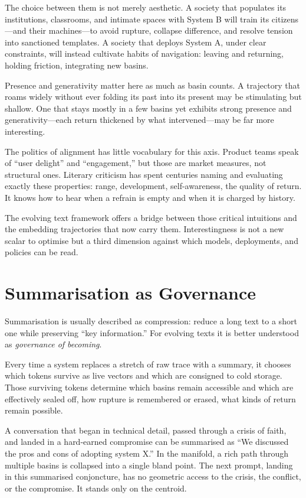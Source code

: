 \documentclass[12pt,a4paper]{article}
\begin{document}
The choice between them is not merely aesthetic. A society that populates its institutions, classrooms, and intimate spaces with System B will train its citizens---and their machines---to avoid rupture, collapse difference, and resolve tension into sanctioned templates. A society that deploys System A, under clear constraints, will instead cultivate habits of navigation: leaving and returning, holding friction, integrating new basins.

Presence and generativity matter here as much as basin counts. A trajectory that roams widely without ever folding its past into its present may be stimulating but shallow. One that stays mostly in a few basins yet exhibits strong presence and generativity---each return thickened by what intervened---may be far more interesting.

The politics of alignment has little vocabulary for this axis. Product teams speak of ``user delight'' and ``engagement,'' but those are market measures, not structural ones. Literary criticism has spent centuries naming and evaluating exactly these properties: range, development, self-awareness, the quality of return. It knows how to hear when a refrain is empty and when it is charged by history.

The evolving text framework offers a bridge between those critical intuitions and the embedding trajectories that now carry them. Interestingness is not a new scalar to optimise but a third dimension against which models, deployments, and policies can be read.


\section{Summarisation as Governance}

Summarisation is usually described as compression: reduce a long text to a short one while preserving ``key information.'' For evolving texts it is better understood as \emph{governance of becoming}.

Every time a system replaces a stretch of raw trace with a summary, it chooses which tokens survive as live vectors and which are consigned to cold storage. Those surviving tokens determine which basins remain accessible and which are effectively sealed off, how rupture is remembered or erased, what kinds of return remain possible.

A conversation that began in technical detail, passed through a crisis of faith, and landed in a hard-earned compromise can be summarised as ``We discussed the pros and cons of adopting system X.'' In the manifold, a rich path through multiple basins is collapsed into a single bland point. The next prompt, landing in this summarised conjoncture, has no geometric access to the crisis, the conflict, or the compromise. It stands only on the centroid.
\end{document}
